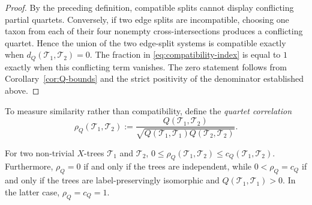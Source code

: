 \documentclass[12pt]{article}
\begin{document}
\begin{proof}
By the preceding definition, compatible splits cannot display
conflicting partial quartets.  Conversely, if two edge splits are
incompatible, choosing one taxon from each of their four nonempty
cross-intersections produces a conflicting quartet.  Hence the union of the
two edge-split systems is compatible exactly when
$d_Q(\mathcal T_1,\mathcal T_2)=0$.  The fraction in \eqref{eq:compatibility-index} is equal
to $1$ exactly when this conflicting term
vanishes.  The zero statement follows from Corollary~\ref{cor:Q-bounds} and
the strict positivity of the denominator established above.
\end{proof}

To measure similarity rather than compatibility, define the
\emph{quartet correlation}
\begin{equation}\label{eq:quartet-correlation}
\rho_Q(\mathcal T_1,\mathcal T_2):=
\frac{Q(\mathcal T_1,\mathcal T_2)}
{\sqrt{Q(\mathcal T_1,\mathcal T_1)Q(\mathcal T_2,\mathcal T_2)}}.
\end{equation}

\begin{proposition}\label{prop:correlation}
For two non-trivial $X$-trees $\mathcal T_1$ and $\mathcal T_2$,
$0\le\rho_Q(\mathcal T_1,\mathcal T_2)
\le c_Q(\mathcal T_1,\mathcal T_2)$.
Furthermore, $\rho_Q=0$ if and only if the trees are independent, while
$0<\rho_Q=c_Q$ if and only if the trees are label-preservingly isomorphic
and $Q(\mathcal T_1,\mathcal T_1)>0$.  In the latter case,
$\rho_Q=c_Q=1$.
\end{proposition}
\end{document}
